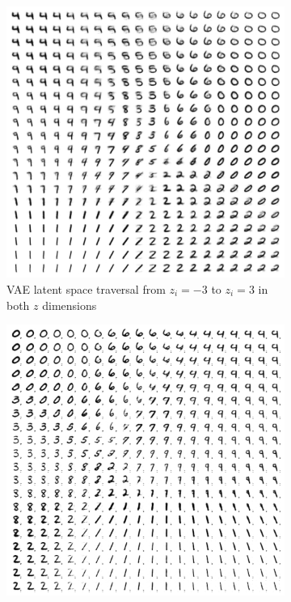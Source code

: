 \begin{figure}
    \centering
    \begin{subfigure}{.45\textwidth}
        \centering
        \includegraphics[width=\textwidth]{images/latent_space_traversals/vae_mnist.png}
        \caption{\ac{VAE} latent space traversal from $z_i=-3$ to $z_i=3$ in both $z$ dimensions}
    \end{subfigure}
    \hfill
    \begin{subfigure}{.45\textwidth}
        \centering
        \includegraphics[width=\textwidth]{images/latent_space_traversals/vae_gan_mnist.png}

\end{subfigure}
\end{figure}
